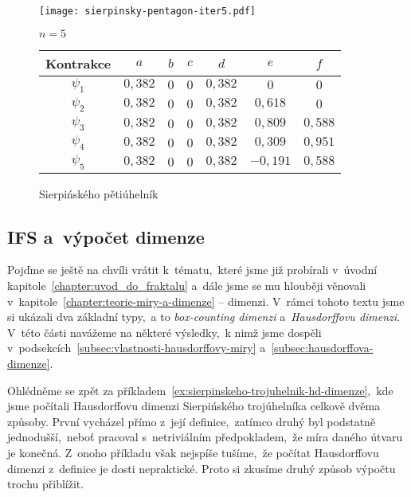 \begin{figure}[H]
    \centering
    \texttt{[image: sierpinsky-pentagon-iter5.pdf]}
    \begin{center}
        $n=5$
    \end{center}
    \begin{tabular}{c|cccccc}
    Kontrakce   & $a$   & $b$   & $c$   & $d$   & $e$   & $f$                   \\\hline
    $\psi_1$    & $0{,}382$ & $0$ & $0$ & $0{,}382$ & $0$   & $0$               \\
    $\psi_2$    & $0{,}382$ & $0$ & $0$ & $0{,}382$ & $0{,}618$   & $0$         \\
    $\psi_3$    & $0{,}382$ & $0$ & $0$ & $0{,}382$ & $0{,}809$   & $0{,}588$   \\
    $\psi_4$    & $0{,}382$ & $0$ & $0$ & $0{,}382$ & $0{,}309$   & $0{,}951$   \\
    $\psi_5$    & $0{,}382$ & $0$ & $0$ & $0{,}382$ & $-0{,}191$   & $0{,}588$  \\
    \end{tabular}
    \caption{Sierpińského pětiúhelník}
    \label{fig:sierpinskeho-petiuhelnik}
\end{figure}

\subsection{IFS a~výpočet dimenze}\label{subsec:ifs-vypocet-dimenze}

Pojďme se ještě na chvíli vrátit k~tématu,~které jsme již probírali v~úvodní kapitole~\ref{chapter:uvod_do_fraktalu} a~dále jsme se mu hlouběji věnovali v~kapitole~\ref{chapter:teorie-miry-a-dimenze} -- dimenzi. V~rámci tohoto textu jsme si ukázali dva základní typy,~a to \emph{box-counting dimenzi} a~\emph{Hausdorffovu dimenzi}. V~této části navážeme na některé výsledky,~k nimž jsme dospěli v~podsekcích~\ref{subsec:vlastnosti-hausdorffovy-miry} a~\ref{subsec:hausdorffova-dimenze}.

Ohlédněme se zpět za příkladem~\ref{ex:sierpinskeho-trojuhelnik-hd-dimenze},~kde jsme počítali Hausdorffovu dimenzi Sierpińského trojúhelníka celkově dvěma způsoby. První vycházel přímo z~její definice,~zatímco druhý byl podstatně jednodušší,~neboť pracoval s~netriviálním předpokladem,~že míra daného útvaru je konečná. Z~onoho příkladu však nejspíše tušíme,~že počítat Hausdorffovu dimenzi z~definice je dosti nepraktické. Proto si zkusíme druhý způsob výpočtu trochu přiblížit.

